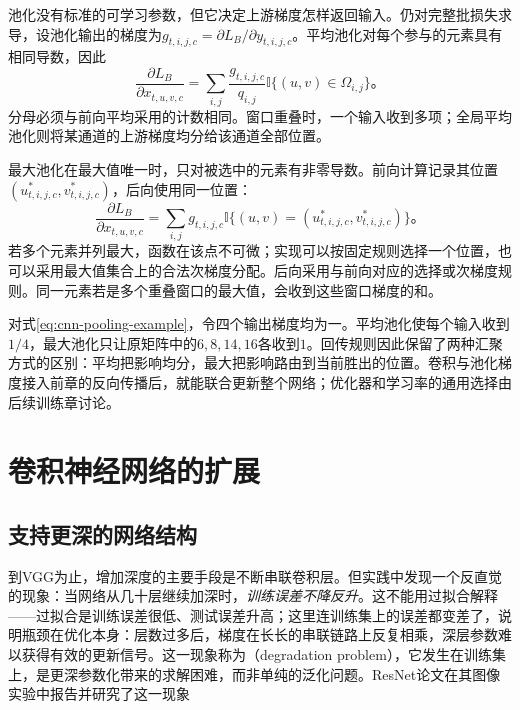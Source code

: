池化没有标准的可学习参数，但它决定上游梯度怎样返回输入。仍对完整批损失求导，设池化输出的梯度为$g_{t,i,j,c}=\partial L_B/\partial y_{t,i,j,c}$。平均池化对每个参与的元素具有相同导数，因此
\begin{equation}
  \frac{\partial L_B}{\partial x_{t,u,v,c}}
  =\sum_{i,j}\frac{g_{t,i,j,c}}{q_{i,j}}
                  \mathbb I\{(u,v)\in\Omega_{i,j}\}\text{。}
  \label{eq:cnn-average-pooling-gradient}
\end{equation}
分母必须与前向平均采用的计数相同。窗口重叠时，一个输入收到多项；全局平均池化则将某通道的上游梯度均分给该通道全部位置。

最大池化在最大值唯一时，只对被选中的元素有非零导数。前向计算记录其位置$(u^*_{t,i,j,c},v^*_{t,i,j,c})$，后向使用同一位置：
\begin{equation}
  \frac{\partial L_B}{\partial x_{t,u,v,c}}
  =\sum_{i,j}g_{t,i,j,c}
       \mathbb I\{(u,v)=(u^*_{t,i,j,c},v^*_{t,i,j,c})\}\text{。}
  \label{eq:cnn-max-pooling-gradient}
\end{equation}
若多个元素并列最大，函数在该点不可微；实现可以按固定规则选择一个位置，也可以采用最大值集合上的合法次梯度分配。后向采用与前向对应的选择或次梯度规则。同一元素若是多个重叠窗口的最大值，会收到这些窗口梯度的和。

对式\eqref{eq:cnn-pooling-example}，令四个输出梯度均为一。平均池化使每个输入收到$1/4$，最大池化只让原矩阵中的$6,8,14,16$各收到$1$。回传规则因此保留了两种汇聚方式的区别：平均把影响均分，最大把影响路由到当前胜出的位置。卷积与池化梯度接入前章的反向传播后，就能联合更新整个网络；优化器和学习率的通用选择由后续训练章讨论。

\section{卷积神经网络的扩展}
\label{sec:cnn-extensions}

\subsection{支持更深的网络结构}
\label{sec:cnn-deep-structures}

到VGG为止，增加深度的主要手段是不断串联卷积层。但实践中发现一个反直觉的现象：当网络从几十层继续加深时，\emph{训练误差不降反升}。这不能用过拟合解释——过拟合是训练误差很低、测试误差升高；这里连训练集上的误差都变差了，说明瓶颈在优化本身：层数过多后，梯度在长长的串联链路上反复相乘，深层参数难以获得有效的更新信号。这一现象称为（degradation problem），它发生在训练集上，是更深参数化带来的求解困难，而非单纯的泛化问题。ResNet论文在其图像实验中报告并研究了这一现象

